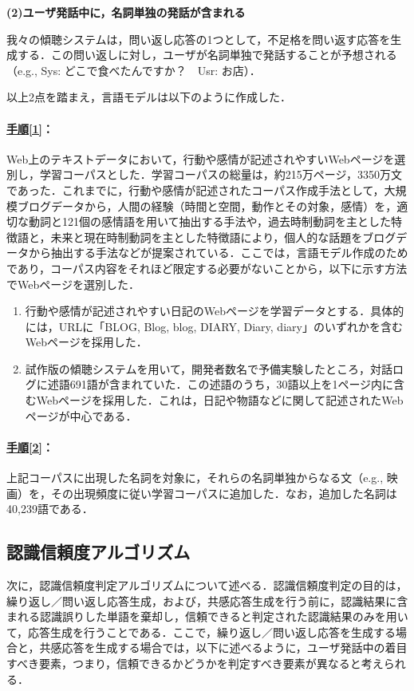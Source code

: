 \documentclass[japanese]{jnlp_1.4}
\begin{document}
\noindent\textbf{(2)ユーザ発話中に，名詞単独の発話が含まれる}

我々の傾聴システムは，問い返し応答の1つとして，不足格を問い返す応答を生成する．この問い返しに対し，ユーザが名詞単独で発話することが予想される（e.g., Sys: どこで食べたんですか？　Usr: お店）．

以上2点を踏まえ，言語モデルは以下のように作成した．

\paragraph{\underline{手順[1]}：}Web上のテキストデータ\cite{no38}において，行動や感情が記述されやすいWebページを選別し，学習コーパスとした．学習コーパスの総量は，約215万ページ，3350万文であった．これまでに，行動や感情が記述されたコーパス作成手法として，大規模ブログデータから，人間の経験（時間と空間，動作とその対象，感情）を，適切な動詞と121個の感情語を用いて抽出する手法\cite{no39}や，過去時制動詞を主とした特徴語と，未来と現在時制動詞を主とした特徴語により，個人的な話題をブログデータから抽出する手法\cite{no40}などが提案されている．ここでは，言語モデル作成のためであり，コーパス内容をそれほど限定する必要がないことから，以下に示す方法でWebページを選別した．

\begin{enumerate}
  \item 行動や感情が記述されやすい日記のWebページを学習データとする．具体的には，URLに「BLOG, Blog, blog, DIARY, Diary, diary」のいずれかを含むWebページを採用した．
  \item 試作版の傾聴システムを用いて，開発者数名で予備実験したところ，対話ログに述語691語が含まれていた．この述語のうち，30語以上を1ページ内に含むWebページを採用した．これは，日記や物語などに関して記述されたWebページが中心である．
\end{enumerate}
 

\paragraph{\underline{手順[2]}：}上記コーパスに出現した名詞を対象に，それらの名詞単独からなる文（e.g., 映画）を，その出現頻度に従い学習コーパスに追加した．なお，追加した名詞は40,239語である．



\subsection{認識信頼度アルゴリズム}

次に，認識信頼度判定アルゴリズムについて述べる．認識信頼度判定の目的は，繰り返し／問い返し応答生成，および，共感応答生成を行う前に，認識結果に含まれる認識誤りした単語を棄却し，信頼できると判定された認識結果のみを用いて，応答生成を行うことである．ここで，繰り返し／問い返し応答を生成する場合と，共感応答を生成する場合では，以下に述べるように，ユーザ発話中の着目すべき要素，つまり，信頼できるかどうかを判定すべき要素が異なると考えられる．
\end{document}
